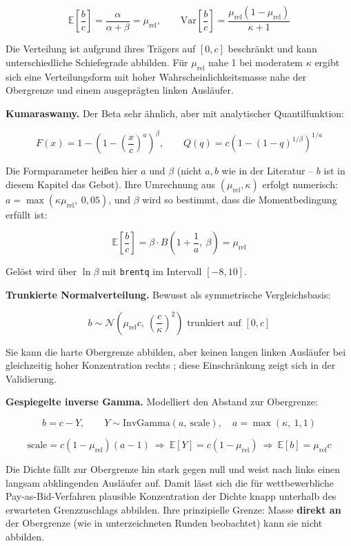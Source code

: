 \documentclass[
  a4paper,
  10pt]{article}
\begin{document}
\[ \mathbb{E}\left[\frac{b}{c}\right] = \frac{\alpha}{\alpha+\beta} = \mu_{\mathrm{rel}}, \qquad \mathrm{Var}\left[\frac{b}{c}\right] = \frac{\mu_{\mathrm{rel}}(1-\mu_{\mathrm{rel}})}{\kappa+1} \]

Die Verteilung ist aufgrund ihres Trägers auf \([0,c]\) beschränkt und
kann unterschiedliche Schiefegrade abbilden. Für \(\mu_{\mathrm{rel}}\)
nahe 1 bei moderatem \(\kappa\) ergibt sich eine Verteilungsform mit
hoher Wahrscheinlichkeitsmasse nahe der Obergrenze und einem
ausgeprägten linken Ausläufer.

\textbf{Kumaraswamy.} Der Beta sehr ähnlich, aber mit analytischer
Quantilfunktion:

\[ F(x) = 1 - \left(1 - \left(\frac{x}{c}\right)^{a}\right)^{\beta}, \qquad Q(q) = c\left(1 - (1-q)^{1/\beta}\right)^{1/a} \]

Die Formparameter heißen hier \(a\) und \(\beta\) (nicht \(a, b\) wie in
der Literatur -- \(b\) ist in diesem Kapitel das Gebot). Ihre Umrechnung
aus \((\mu_{\mathrm{rel}}, \kappa)\) erfolgt numerisch:
\(a = \max(\kappa \mu_{\mathrm{rel}},\ 0{,}05)\), und \(\beta\) wird so
bestimmt, dass die Momentbedingung erfüllt ist:

\[ \mathbb{E}\left[\frac{b}{c}\right] = \beta \cdot B\left(1 + \frac{1}{a},\ \beta\right) = \mu_{\mathrm{rel}} \]

Gelöst wird über \(\ln \beta\) mit \texttt{brentq} im Intervall
\([-8, 10]\).

\textbf{Trunkierte Normalverteilung.} Bewusst als symmetrische
Vergleichsbasis:

\[ b \sim \mathcal{N}\left(\mu_{\mathrm{rel}} c,\ \left(\frac{c}{\kappa}\right)^2\right) \text{ trunkiert auf } [0, c] \]

Sie kann die harte Obergrenze abbilden, aber keinen langen linken
Ausläufer bei gleichzeitig hoher Konzentration rechts ; diese
Einschränkung zeigt sich in der Validierung.

\textbf{Gespiegelte inverse Gamma.} Modelliert den Abstand zur
Obergrenze:

\[ b = c - Y, \qquad Y \sim \mathrm{InvGamma}\left(a,\ \text{scale}\right), \quad a = \max(\kappa,\ 1{,}1) \]

\[ \text{scale} = c\left(1 - \mu_{\mathrm{rel}}\right)(a-1) \ \Longrightarrow\ \mathbb{E}[Y] = c(1-\mu_{\mathrm{rel}}) \ \Longrightarrow\ \mathbb{E}[b] = \mu_{\mathrm{rel}} c \]

Die Dichte fällt zur Obergrenze hin stark gegen null und weist nach
links einen langsam abklingenden Ausläufer auf. Damit lässt sich die für
wettbewerbliche Pay-as-Bid-Verfahren plausible Konzentration der Dichte
knapp unterhalb des erwarteten Grenzzuschlags abbilden. Ihre
prinzipielle Grenze: Masse \textbf{direkt an} der Obergrenze (wie in
unterzeichneten Runden beobachtet) kann sie nicht abbilden.
\end{document}
